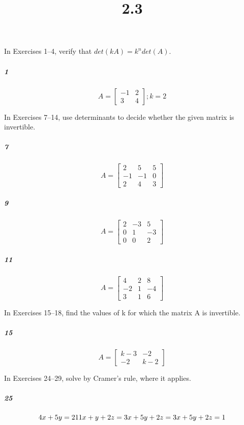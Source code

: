 \documentclass[fleqn]{article}
\title{2.3}
\begin{document}
\maketitle
\pagebreak
In Exercises 1–4, verify that $det(kA) = k^n det(A)$.

\subparagraph{1}

\[
A = \begin{bmatrix} -1 & 2\\ 3 & 4 \end{bmatrix}; k = 2
\]
\vfill

In Exercises 7–14, use determinants to decide whether the given matrix is invertible.

\subparagraph{7}

\[
A = \begin{bmatrix} 2 & 5 & 5 \\ -1 & -1 & 0 \\ 2 & 4 & 3 \end{bmatrix}
\]
\vfill


\pagebreak


\subparagraph{9}

\[
A = \begin{bmatrix} 2 & -3 & 5 \\ 0 & 1 & -3 \\ 0 & 0 & 2 \end{bmatrix}
\]
\vfill



\subparagraph{11}

\[
A = \begin{bmatrix} 4 & 2 & 8 \\ -2 & 1 & -4 \\ 3 & 1 & 6 \end{bmatrix}
\]
\vfill


\pagebreak
In Exercises 15–18, find the values of k for which the matrix A is invertible.

\subparagraph{15}

\[
A = \begin{bmatrix} k-3 & -2 \\ -2 & k-2 \end{bmatrix}
\]
\vfill

In Exercises 24–29, solve by Cramer's rule, where it applies.

\subparagraph{25}

\[
4x + 5y = 2 \\ 11x + y + 2z = 3 \\ x + 5y + 2z = 3 \\ x + 5y + 2z = 1
\]
\vfill
\end{document}
